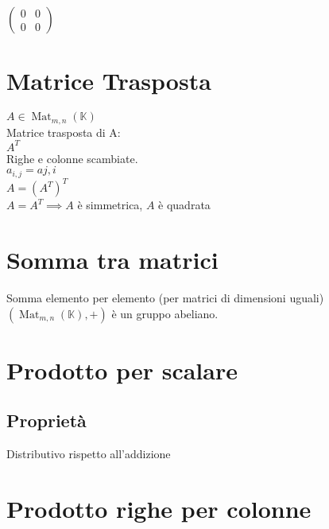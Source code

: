 \documentclass[a4paper, twoside, italian, 11pt]{book}
\DeclareMathOperator{\Mat}{Mat}
\newcommand{\K}{\mathbb K}
\begin{document}
\noindent
$\begin{pmatrix}
0 & 0 \\
0 & 0
\end{pmatrix}$



\section{Matrice Trasposta}

$A \in \Mat_{m,n}(\K)$ \\

\noindent
Matrice trasposta di A: \\
$A^T$ \\

\noindent
Righe e colonne scambiate. \\
$a_{i,j} = a{j,i}$ \\

\noindent
$A = (A^T)^T$ \\

\noindent
$A = A^T \implies A$ è simmetrica, $A$ è quadrata



\section{Somma tra matrici}

Somma elemento per elemento (per matrici di dimensioni uguali) \\

\noindent
$(\Mat_{m,n}(\K), +)$ è un gruppo abeliano.



\section{Prodotto per scalare}



\subsection{Proprietà}

Distributivo rispetto all'addizione



\section{Prodotto righe per colonne}
\end{document}
